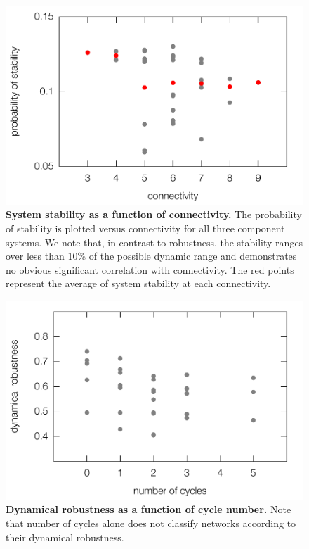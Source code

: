 \pagebreak

\begin{figure}[!ht]
\centering
\noindent\includegraphics[width=0.6\columnwidth]{fig/apstab3x3.pdf}
\caption{{\bf System stability as a function of connectivity.} The probability of stability is plotted versus connectivity for all three component systems. We note that, in contrast to robustness, the stability ranges over less than 10\% of the possible dynamic range and demonstrates no obvious significant correlation with connectivity. The red points represent the average of system stability at each connectivity.}
\label{fig:apstab3x3}
\end{figure}

\pagebreak
\FloatBarrier

\begin{figure}[!ht]
\centering
\noindent\includegraphics[width=0.6\columnwidth]{fig/cycle3x3.pdf}
\caption{{\bf Dynamical robustness as a function of cycle number.} Note that number of cycles alone does not classify networks according to their dynamical robustness.}
\label{fig:cycle3x3}
\end{figure}


